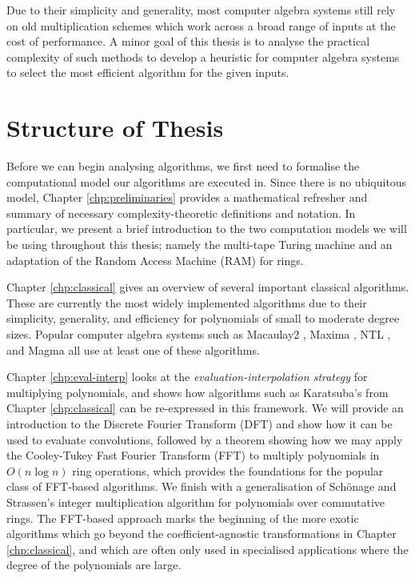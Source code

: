Due to their simplicity and generality, most computer algebra systems still rely on old multiplication schemes which work across a broad range of inputs at the cost of performance. A minor goal of this thesis is to analyse the practical complexity of such methods to develop a heuristic for computer algebra systems to select the most efficient algorithm for the given inputs.

\section{Structure of Thesis}
\label{sec:Structure-of-Thesis}

Before we can begin analysing algorithms, we first need to formalise the computational model our algorithms are executed in. Since there is no ubiquitous model, Chapter \ref{chp:preliminaries} provides a mathematical refresher and summary of necessary complexity-theoretic definitions and notation. In particular, we present a brief introduction to the two computation models we will be using throughout this thesis; namely the multi-tape Turing machine and an adaptation of the Random Access Machine (RAM) for rings.

Chapter \ref{chp:classical} gives an overview of several important classical algorithms. These are currently the most widely implemented algorithms due to their simplicity, generality, and efficiency for polynomials of small to moderate degree sizes. Popular computer algebra systems such as Macaulay2 \cite{macaulay2-polynomial}, Maxima \cite{maxima-karatsuba}, NTL \cite{ntl}, and Magma \cite{magma} all use at least one of these algorithms.

Chapter \ref{chp:eval-interp} looks at the \emph{evaluation-interpolation strategy} for multiplying polynomials, and shows how algorithms such as Karatsuba's from Chapter \ref{chp:classical} can be re-expressed in this framework. We will provide an introduction to the Discrete Fourier Transform (DFT) and show how it can be used to evaluate convolutions, followed by a theorem showing how we may apply the Cooley-Tukey Fast Fourier Transform (FFT) to multiply polynomials in $O(n \log n)$ ring operations, which provides the foundations for the popular class of FFT-based algorithms. We finish with a generalisation of Sch\"{o}nage and Strassen's integer multiplication algorithm for polynomials over commutative rings. The FFT-based approach marks the beginning of the more exotic algorithms which go beyond the coefficient-agnostic transformations in Chapter \ref{chp:classical}, and which are often only used in specialised applications where the degree of the polynomials are large.


